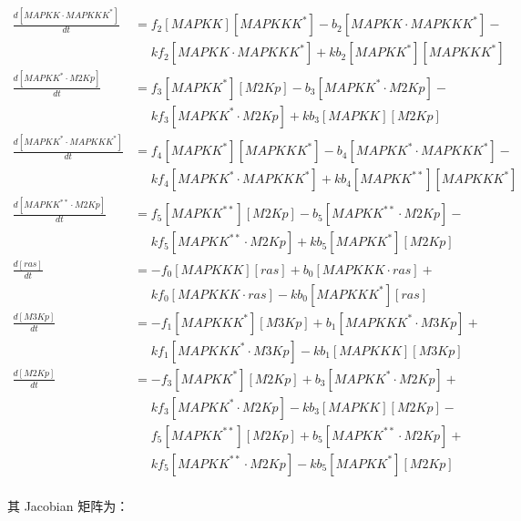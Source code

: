 \begin{equation*}
\begin{align*}
    \frac{d[MAPKK\cdot{}MAPKKK^{*}]}{dt} &= f_{2}[MAPKK][MAPKKK^{*}] - b_{2}[MAPKK\cdot{}MAPKKK^{*}] -\\
    &\phantom{=} kf_{2}[MAPKK\cdot{}MAPKKK^{*}] + kb_{2}[MAPKK^{*}][MAPKKK^{*}]\\
    \frac{d[MAPKK^{*}\cdot{}M2Kp]}{dt} &= f_{3}[MAPKK^{*}][M2Kp] - b_{3}[MAPKK^{*}\cdot{}M2Kp] -\\
    &\phantom{=} kf_{3}[MAPKK^{*}\cdot{}M2Kp] + kb_{3}[MAPKK][M2Kp]\\
    \frac{d[MAPKK^{*}\cdot{}MAPKKK^{*}]}{dt} &= f_{4}[MAPKK^{*}][MAPKKK^{*}] - b_{4}[MAPKK^{*}\cdot{}MAPKKK^{*}] -\\
    &\phantom{=} kf_{4}[MAPKK^{*}\cdot{}MAPKKK^{*}] + kb_{4}[MAPKK^{**}][MAPKKK^{*}]\\
    \frac{d[MAPKK^{**}\cdot{}M2Kp]}{dt} &= f_{5}[MAPKK^{**}][M2Kp] - b_{5}[MAPKK^{**}\cdot{}M2Kp] -\\
    &\phantom{=} kf_{5}[MAPKK^{**}\cdot{}M2Kp] + kb_{5}[MAPKK^{*}][M2Kp]\\
    \frac{d[ras]}{dt} &= -f_{0}[MAPKKK][ras] + b_{0}[MAPKKK\cdot{}ras] +\\
    &\phantom{=} kf_{0}[MAPKKK\cdot{}ras] - kb_{0}[MAPKKK^{*}][ras]\\
    \frac{d[M3Kp]}{dt} &= -f_{1}[MAPKKK^{*}][M3Kp] + b_{1}[MAPKKK^{*}\cdot{}M3Kp] +\\
    &\phantom{=} kf_{1}[MAPKKK^{*}\cdot{}M3Kp] - kb_{1}[MAPKKK][M3Kp]\\
    \frac{d[M2Kp]}{dt} &= -f_{3}[MAPKK^{*}][M2Kp] + b_{3}[MAPKK^{*}\cdot{}M2Kp] +\\
    &\phantom{=} kf_{3}[MAPKK^{*}\cdot{}M2Kp] - kb_{3}[MAPKK][M2Kp] -\\
    &\phantom{=} f_{5}[MAPKK^{**}][M2Kp] + b_{5}[MAPKK^{**}\cdot{}M2Kp] +\\
    &\phantom{=} kf_{5}[MAPKK^{**}\cdot{}M2Kp] - kb_{5}[MAPKK^{*}][M2Kp]\\
  \end{align*}
\end{equation*}
\normalsize

其 Jacobian 矩阵为：

